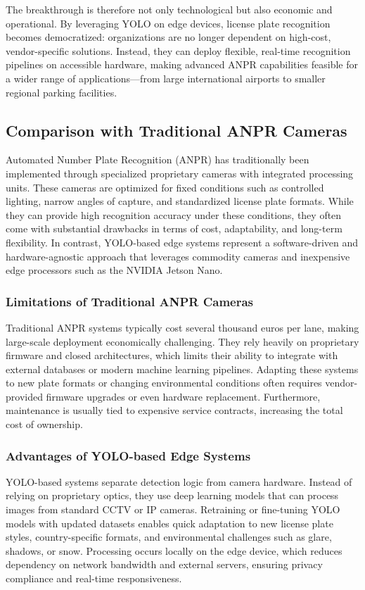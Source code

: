 		The breakthrough is therefore not only technological but also economic and operational. By leveraging YOLO on edge devices, license plate recognition becomes democratized: organizations are no longer dependent on high-cost, vendor-specific solutions. Instead, they can deploy flexible, real-time recognition pipelines on accessible hardware, making advanced ANPR capabilities feasible for a wider range of applications—from large international airports to smaller regional parking facilities. 
		
		
	\subsection{Comparison with Traditional ANPR Cameras}
	Automated Number Plate Recognition (ANPR) has traditionally been implemented through specialized proprietary cameras with integrated processing units. These cameras are optimized for fixed conditions such as controlled lighting, narrow angles of capture, and standardized license plate formats. While they can provide high recognition accuracy under these conditions, they often come with substantial drawbacks in terms of cost, adaptability, and long-term flexibility. In contrast, YOLO-based edge systems represent a software-driven and hardware-agnostic approach that leverages commodity cameras and inexpensive edge processors such as the NVIDIA Jetson Nano.
	
	\subsubsection*{Limitations of Traditional ANPR Cameras}
	Traditional ANPR systems typically cost several thousand euros per lane, making large-scale deployment economically challenging. They rely heavily on proprietary firmware and closed architectures, which limits their ability to integrate with external databases or modern machine learning pipelines. Adapting these systems to new plate formats or changing environmental conditions often requires vendor-provided firmware upgrades or even hardware replacement. Furthermore, maintenance is usually tied to expensive service contracts, increasing the total cost of ownership.
	
	\subsubsection*{Advantages of YOLO-based Edge Systems}
	YOLO-based systems separate detection logic from camera hardware. Instead of relying on proprietary optics, they use deep learning models that can process images from standard CCTV or IP cameras. Retraining or fine-tuning YOLO models with updated datasets enables quick adaptation to new license plate styles, country-specific formats, and environmental challenges such as glare, shadows, or snow. Processing occurs locally on the edge device, which reduces dependency on network bandwidth and external servers, ensuring privacy compliance and real-time responsiveness.
	

